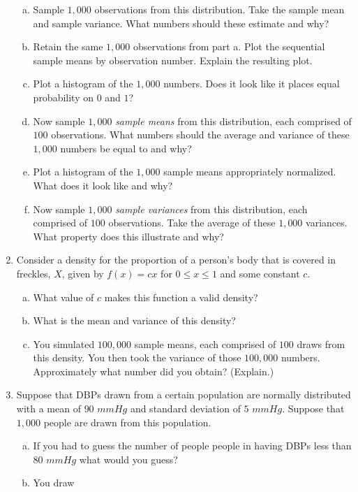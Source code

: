 \documentclass[12pt]{article}
\begin{document}
\begin{enumerate}[Problem 1.]
  \begin{enumerate}[a.]
  \item Sample $1,000$ observations from this distribution. Take the
    sample mean and sample variance. What numbers should these
    estimate and why?
  \item Retain the same $1,000$ observations from part a. Plot the
    sequential sample means by observation number. Explain the
    resulting plot.
  \item Plot a histogram of the $1,000$ numbers. Does it look like it places
    equal probability on $0$ and $1$?
  \item Now sample $1,000$ {\em sample means} from this distribution,
    each comprised of $100$ observations. What numbers should the
    average and variance of these $1,000$ numbers be equal to and why?
 \item Plot a histogram of the $1,000$ sample means appropriately
    normalized. What does it look like and why?
  \item Now sample $1,000$ {\em sample variances} from this distribution,
    each comprised of $100$ observations. Take the average of these
    $1,000$ variances. What property does this illustrate and why?
  \end{enumerate}
\item Consider a density for the proportion of a person's body that is
  covered in freckles, $X$, given by $f(x) = cx$ for $0 \leq x \leq 1$
  and some constant $c$.
  \begin{enumerate}[a.]
  \item What value of $c$ makes this function a valid density?
  \item What is the mean and variance of this density?
  \item You simulated $100,000$ sample means, each comprised of $100$
    draws from this density. You then took the variance of those
    $100,000$ numbers. Approximately what number did you obtain?
    (Explain.)
  \end{enumerate}
\item Suppose that DBPs drawn from a certain population are normally
    distributed with a mean of $90$ $mmHg$ and standard deviation of $5$
    $mmHg$. Suppose that $1,000$ people are drawn from this population.
  \begin{enumerate}[a.]
  \item If you had to guess the number of people people in having DBPs
    less than $80$ $mmHg$ what would you guess?
  \item  You draw

\end{enumerate}
\end{enumerate}
\end{document}
